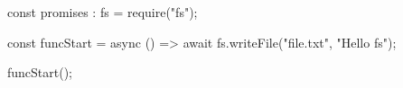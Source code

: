 const { promises : fs } = require("fs");

const funcStart = async () => {
    await fs.writeFile("file.txt", "Hello fs");
}

funcStart();